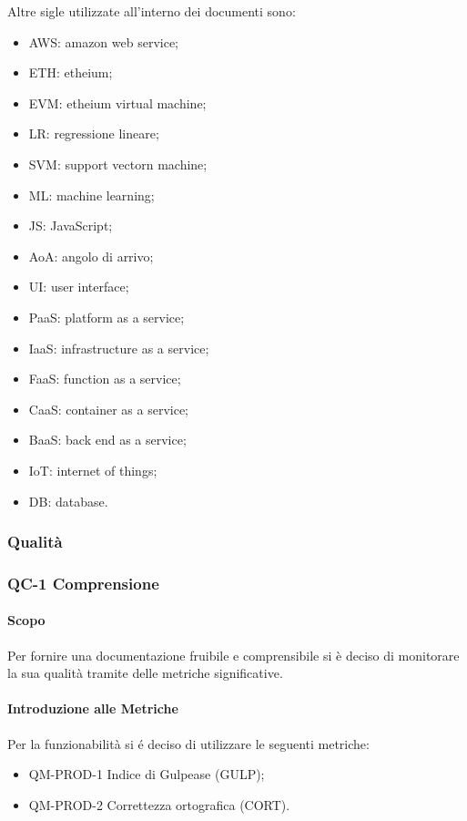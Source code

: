 				Altre sigle utilizzate all'interno dei documenti sono:
				\begin{itemize}
					\item AWS: amazon web service;
					\item ETH: etheium;
					\item EVM: etheium virtual machine;
					\item LR: regressione lineare;
					\item SVM: support vectorn machine;
					\item ML: machine learning;
					\item JS: JavaScript;
					\item AoA: angolo di arrivo;
					\item UI: user interface;
					\item PaaS: platform as a service;
					\item IaaS: infrastructure as a service;
					\item FaaS: function as a service;
					\item CaaS: container as a service;
					\item BaaS: back end as a service;
					\item IoT: internet of things;
					\item DB: database.
				\end{itemize}
		\subsubsection{Qualità}
			\subsubsection{QC-1 Comprensione}
				\paragraph{Scopo}
					Per fornire una documentazione fruibile e comprensibile si è deciso di monitorare la sua qualità tramite delle metriche significative.
				\paragraph{Introduzione alle Metriche}
					Per la funzionabilità si é deciso di utilizzare le seguenti metriche:
					\begin{itemize}
						\item QM-PROD-1 Indice di Gulpease (GULP);
						\item QM-PROD-2 Correttezza ortografica (CORT).
					\end{itemize}
